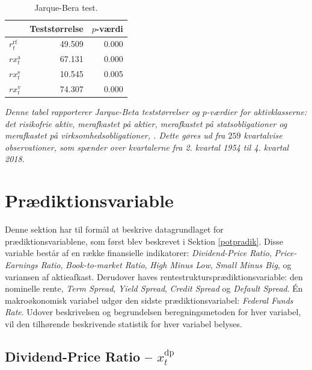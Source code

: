 \documentclass[
  a4paper,
  oneside]{memoir}
\begin{document}
\begin{table}[H]

\caption{\label{tab:JB-AKTIVKLASSE}Jarque-Bera test.}
\centering
\begin{threeparttable}
\begin{tabular}[t]{lrr}
\toprule
  & Teststørrelse & $p$-værdi\\
\midrule
\rowcolor{gray!6}  $r_t^{\text{rf}}$ & 49.509 & 0.000\\
$rx_t^{\text{a}}$ & 67.131 & 0.000\\
\rowcolor{gray!6}  $rx_t^{\text{s}}$ & 10.545 & 0.005\\
$rx_t^{\text{v}}$ & 74.307 & 0.000\\
\bottomrule
\end{tabular}
\begin{tablenotes}
\item \textit{Denne tabel rapporterer Jarque-Beta teststørrelser og $p$-værdier for aktivklasserne: det risikofrie aktiv, merafkastet på aktier, merafkastet på statsobligationer og merafkastet på virksomhedsobligationer, \citep{Jarque1980}. Dette gøres ud fra $259$ kvartalvise observationer, som spænder over kvartalerne fra 2. kvartal 1954 til 4. kvartal 2018.}
\end{tablenotes}
\end{threeparttable}
\end{table}

\hypertarget{pvariable}{%
\section{Prædiktionsvariable}\label{pvariable}}

Denne sektion har til formål at beskrive datagrundlaget for prædiktionsvariablene, som først blev beskrevet i Sektion \ref{potpradik}. Disse variable består af en række finansielle indikatorer: \emph{Dividend-Price Ratio}, \emph{Price-Earnings Ratio}, \emph{Book-to-market Ratio}, \emph{High Minus Low}, \emph{Small Minus Big}, og variansen af aktieafkast. Derudover haves rentestruktursprædiktionsvariable: den nominelle rente, \emph{Term Spread}, \emph{Yield Spread}, \emph{Credit Spread} og \emph{Default Spread}. Én makroøkonomisk variabel udgør den sidste prædiktionsvariabel: \emph{Federal Funds Rate}. Udover beskrivelsen og begrundelsen beregningsmetoden for hver variabel, vil den tilhørende beskrivende statistik for hver variabel belyses.

\hypertarget{dividend-price-ratio-x_ttextdp}{%
\subsection{\texorpdfstring{Dividend-Price Ratio -- \(x_t^{\text{dp}}\)}{Dividend-Price Ratio -- x\_t\^{}\{\textbackslash text\{dp\}\}}}\label{dividend-price-ratio-x_ttextdp}}
\end{document}
